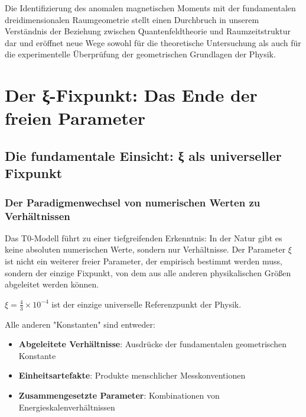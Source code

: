 \documentclass[12pt,a4paper]{report}
\begin{document}
	Die Identifizierung des anomalen magnetischen Moments mit der fundamentalen dreidimensionalen Raumgeometrie stellt einen Durchbruch in unserem Verständnis der Beziehung zwischen Quantenfeldtheorie und Raumzeitstruktur dar und eröffnet neue Wege sowohl für die theoretische Untersuchung als auch für die experimentelle Überprüfung der geometrischen Grundlagen der Physik.
	\chapter{Der ξ-Fixpunkt: Das Ende der freien Parameter}
	\label{chap:xi_fixed_point}
	
	\section{Die fundamentale Einsicht: ξ als universeller Fixpunkt}
	\label{sec:xi_universal_fixed_point}
	
	\subsection{Der Paradigmenwechsel von numerischen Werten zu Verhältnissen}
	\label{subsec:paradigm_shift_ratios}
	
	Das T0-Modell führt zu einer tiefgreifenden Erkenntnis: In der Natur gibt es keine absoluten numerischen Werte, sondern nur Verhältnisse. Der Parameter $\xi$ ist nicht ein weiterer freier Parameter, der empirisch bestimmt werden muss, sondern der einzige Fixpunkt, von dem aus alle anderen physikalischen Größen abgeleitet werden können.
	
	\begin{tcolorbox}[colback=red!5!white,colframe=red!75!black,title=Fundamentale Einsicht]
		$\xi = \frac{4}{3} \times 10^{-4}$ ist der einzige universelle Referenzpunkt der Physik.
		
		Alle anderen "Konstanten" sind entweder:
		\begin{itemize}
			\item \textbf{Abgeleitete Verhältnisse}: Ausdrücke der fundamentalen geometrischen Konstante
			\item \textbf{Einheitsartefakte}: Produkte menschlicher Messkonventionen
			\item \textbf{Zusammengesetzte Parameter}: Kombinationen von Energieskalenverhältnissen
		\end{itemize}
	\end{tcolorbox}
	
\end{document}

